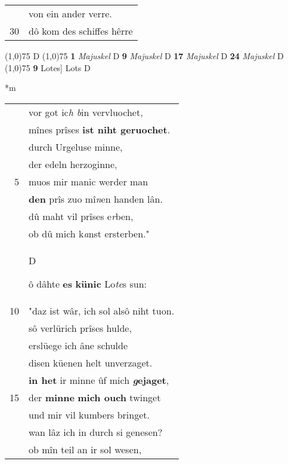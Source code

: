 \documentclass[8pt,a4paper,notitlepage]{article}
\begin{document}
\begin{table}[ht]
\begin{minipage}[t]{0.5\linewidth}
\begin{tabular}{rl}
 & von ein ander verre.\\ 
30 & dô kom des schiffes hêrre\\ 
\end{tabular}
\scriptsize
\line(1,0){75} \newline
D \newline
\line(1,0){75} \newline
\textbf{1} \textit{Majuskel} D  \textbf{9} \textit{Majuskel} D  \textbf{17} \textit{Majuskel} D  \textbf{24} \textit{Majuskel} D  \newline
\line(1,0){75} \newline
\textbf{9} Lotes] Lots D \newline
\end{minipage}
\hspace{0.5cm}
\begin{minipage}[t]{0.5\linewidth}
\small
\begin{center}*m
\end{center}
\begin{tabular}{rl}
 & vor got ic\textit{h b}in vervluochet,\\ 
 & mînes prîses \textbf{ist niht geruochet}.\\ 
 & durch Urgeluse minne,\\ 
 & der edeln herzoginne,\\ 
5 & muos mir manic werder man\\ 
 & \textbf{den} prîs zuo mî\textit{n}en handen lân.\\ 
 & dû maht vil prîses e\textit{r}ben,\\ 
 & ob dû mich k\textit{a}nst ersterben."\\ 
 & \begin{large}D\end{large}ô dâhte \textbf{es} \textbf{künic} Lo\textit{te}s sun:\\ 
10 & "daz ist wâr, ich sol alsô niht tuon.\\ 
 & sô verlürich prîses hulde,\\ 
 & erslüege ich âne schulde\\ 
 & disen küenen helt unverzaget.\\ 
 & \textbf{in het} ir minne ûf mich \textbf{\textit{g}ejaget},\\ 
15 & der \textbf{minne} \textbf{mich ouch} twinget\\ 
 & und mir vil kumbers bringet.\\ 
 & wan lâz ich in durch si genesen?\\ 
 & ob mîn teil an ir sol wesen,\\ 

\end{tabular}
\end{minipage}
\end{table}
\end{document}

